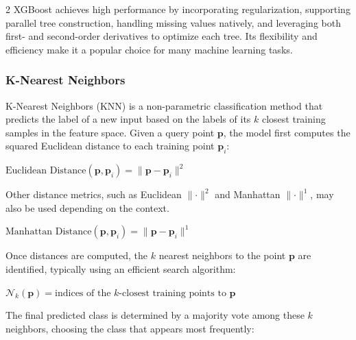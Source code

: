 \documentclass[bst/sn-nature]{sn-jnl}
\begin{document}
\begin{multicols}{2}
XGBoost achieves high performance by incorporating regularization, supporting parallel tree construction, handling missing values natively, and leveraging both first- and second-order derivatives to optimize each tree. Its flexibility and efficiency make it a popular choice for many machine learning tasks.

\subsubsection{K-Nearest Neighbors\cite{knn}}

\quad K-Nearest Neighbors (KNN) is a non-parametric classification method that predicts the label of a new input based on the labels of its $k$ closest training samples in the feature space. Given a query point $\mathbf{p}$, the model first computes the squared Euclidean distance to each training point $\mathbf{p}_i$: \\ 

\begin{center}
    $\text{Euclidean Distance}(\mathbf{p}, \mathbf{p}_i) = \lVert \mathbf{p} - \mathbf{p}_i \rVert^2$ \vspace{0.3cm}
\end{center}

Other distance metrics, such as Euclidean $\lVert \cdot \rVert^2$ and Manhattan $\lVert \cdot \rVert^1$, may also be used depending on the context. \\

\begin{center}
    $\text{Manhattan Distance}(\mathbf{p}, \mathbf{p}_i) = \lVert \mathbf{p} - \mathbf{p}_i \rVert^1$ \vspace{0.3cm}
\end{center}

Once distances are computed, the $k$ nearest neighbors to the point $\mathbf{p}$ are identified, typically using an efficient search algorithm: \\ 

\begin{center}
    $\mathcal{N}_k(\mathbf{p}) = \text{indices of the } k \text{-closest training points to } \mathbf{p}$ \vspace{0.3cm}
\end{center}

The final predicted class is determined by a majority vote among these $k$ neighbors, choosing the class that appears most frequently: \\


\end{multicols}
\end{document}
